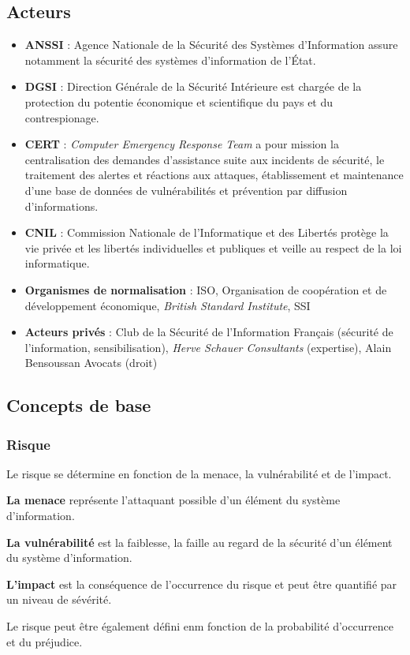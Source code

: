 \documentclass[12pt, a4paper]{article}
\begin{document}
	\subsection{Acteurs}
	\begin{itemize}
		\item \textbf{ANSSI} : Agence Nationale de la Sécurité des Systèmes
		d'Information assure notamment la sécurité des systèmes d'information de
		l'État.
		\item \textbf{DGSI} : Direction Générale de la Sécurité Intérieure est
		chargée de la protection du potentie économique et scientifique du pays et
		du contrespionage.
		\item \textbf{CERT} : \textit{Computer Emergency Response Team} a pour
		mission la centralisation des demandes d'assistance suite aux incidents de
		sécurité, le traitement des alertes et réactions aux attaques, établissement
		 et maintenance d'une base de données de vulnérabilités et prévention par
		diffusion d'informations.
		\item \textbf{CNIL} : Commission Nationale de l'Informatique et des Libertés
		 protège la vie privée et les libertés individuelles et publiques et veille
		 au respect de la loi informatique.
		\item \textbf{Organismes de normalisation} : ISO, Organisation de
		coopération et de développement économique, \textit{British Standard
		Institute}, SSI
		\item \textbf{Acteurs privés} : Club de la Sécurité de l'Information
		Français (sécurité de l'information, sensibilisation), \textit{Herve Schauer
		 Consultants} (expertise), Alain Bensoussan Avocats (droit)
	\end{itemize}
	\subsection{Concepts de base}
	\subsubsection{Risque}
	Le risque se détermine en fonction de la menace, la vulnérabilité et de
	l'impact.
	\par
	\textbf{La menace} représente l'attaquant possible d'un élément du système
	d'information.
	\par
	\textbf{La vulnérabilité} est la faiblesse, la faille au regard de la sécurité
	 d'un élément du système d'information.
	\par
	\textbf{L'impact} est la conséquence de l'occurrence du risque et peut être
	quantifié par un niveau de sévérité.
	\par
	Le risque peut être également défini enm fonction de la probabilité
	d'occurrence et du préjudice.
\end{document}
